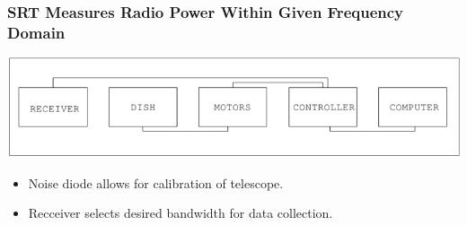 \documentclass{beamer}
\begin{document}
\begin{frame}
  \frametitle{SRT Measures Radio Power Within Given Frequency Domain}
  \includegraphics[width=1\textwidth]{block}
  \begin{itemize}
    \item Noise diode allows for calibration of telescope.
    \item Recceiver selects desired bandwidth for data collection.
  \end{itemize}
\end{frame}
\end{document}
